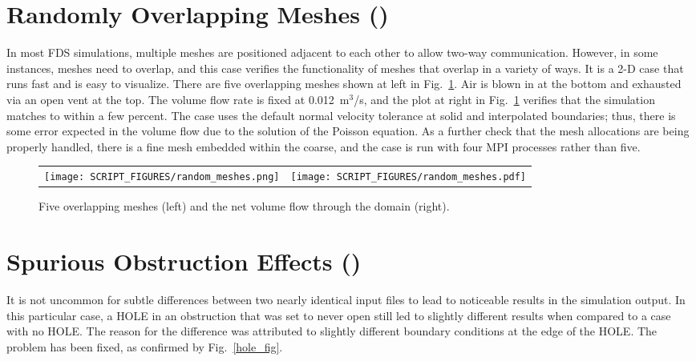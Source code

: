 \documentclass[11pt]{book}
\begin{document}
\section{Randomly Overlapping Meshes (\texorpdfstring{}{random\_meshes})}
\label{random_meshes}

In most FDS simulations, multiple meshes are positioned adjacent to each other to allow two-way communication. However, in some instances, meshes need to overlap, and this case verifies the functionality of meshes that overlap in a variety of ways. It is a 2-D case that runs fast and is easy to visualize. There are five overlapping meshes shown at left in Fig.~\ref{random_meshes_fig}. Air is blown in at the bottom and exhausted via an open vent at the top. The volume flow rate is fixed at 0.012~m$^3$/s, and the plot at right in Fig.~\ref{random_meshes_fig} verifies that the simulation matches to within a few percent. The case uses the default normal velocity tolerance at solid and interpolated boundaries; thus, there is some error expected in the volume flow due to the solution of the Poisson equation. As a further check that the mesh allocations are being properly handled, there is a fine mesh embedded within the coarse, and the case is run with four MPI processes rather than five.

\begin{figure}[!ht]
\begin{tabular*}{\textwidth}{lr}
\texttt{[image: SCRIPT\_FIGURES/random\_meshes.png]} &
\texttt{[image: SCRIPT\_FIGURES/random\_meshes.pdf]}
\end{tabular*}
\caption[The  test case]{Five overlapping meshes (left) and the net volume flow through the domain (right).}
\label{random_meshes_fig}
\end{figure}


\section{Spurious Obstruction Effects (\texorpdfstring{}{hole})}
\label{hole}

It is not uncommon for subtle differences between two nearly identical input files to lead to noticeable results in the simulation output. In this particular case, a {\ct HOLE} in an obstruction that was set to never open still led to slightly different results when compared to a case with no {\ct HOLE}. The reason for the difference was attributed to slightly different boundary conditions at the edge of the {\ct HOLE}. The problem has been fixed, as confirmed by Fig.~\ref{hole_fig}.
\end{document}
